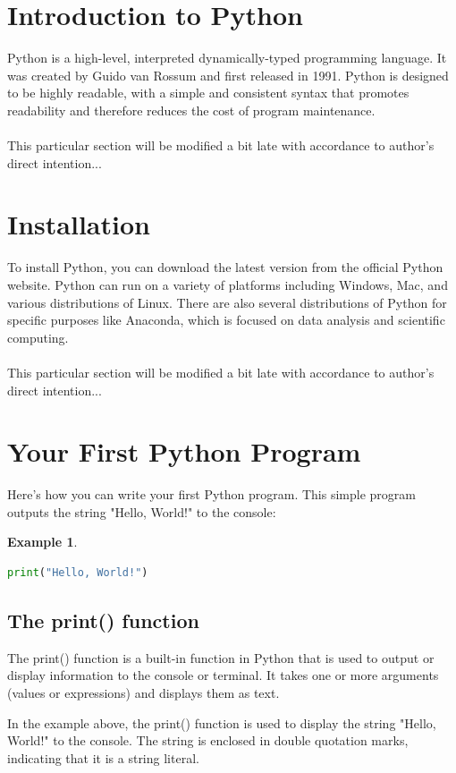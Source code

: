 \documentclass[12pt]{article}
\newtheorem{Example}{Example}[section]
\begin{document}
\section{Introduction to Python}
Python is a high-level, interpreted dynamically-typed programming language. It was created by Guido van Rossum and first released in 1991. Python is designed to be highly readable, with a simple and consistent syntax that promotes readability and therefore reduces the cost of program maintenance.
\\ \\
This particular section will be modified a bit late with accordance to author's direct intention...

\section{Installation}
To install Python, you can download the latest version from the official Python website. Python can run on a variety of platforms including Windows, Mac, and various distributions of Linux. There are also several distributions of Python for specific purposes like Anaconda, which is focused on data analysis and scientific computing.
\\ \\
This particular section will be modified a bit late with accordance to author's direct intention...

\section{Your First Python Program}

Here's how you can write your first Python program. This simple program outputs the string "Hello, World!" to the console:
\begin{Example}
\begin{lstlisting}[language=Python]
print("Hello, World!")
\end{lstlisting}
\end{Example}

\subsection{The print() function}
The print() function is a built-in function in Python that is used to output or display information to the console or terminal. It takes one or more arguments (values or expressions) and displays them as text.

In the example above, the print() function is used to display the string "Hello, World!" to the console. The string is enclosed in double quotation marks, indicating that it is a string literal.
\end{document}

